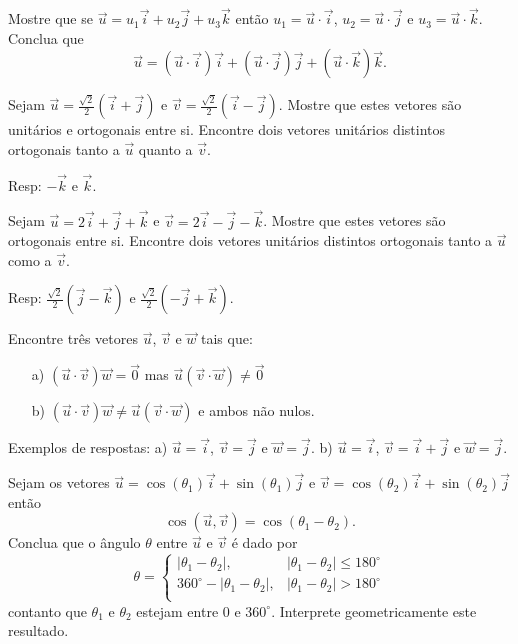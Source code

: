 \begin{exer}Mostre que se $\vec{u}=u_1\vec{i}+u_2\vec{j}+u_3\vec{k}$ então $u_1=\vec{u}\cdot\vec{i}$, $u_2=\vec{u}\cdot\vec{j}$ e $u_3=\vec{u}\cdot\vec{k}$. Conclua que
$$\vec{u}=\left(\vec{u}\cdot\vec{i}\right) \vec{i}+\left(\vec{u}\cdot\vec{j}\right) \vec{j}+\left(\vec{u}\cdot\vec{k}\right) \vec{k}.$$

\end{exer}

\begin{exer}\label{exort1}Sejam $\vec{u}=\frac{\sqrt{2}}{2}\left(\vec{i}+\vec{j}\right)$ e $\vec{v}=\frac{\sqrt{2}}{2}\left(\vec{i}-\vec{j}\right)$. Mostre que estes vetores são unitários e ortogonais entre si. Encontre dois vetores unitários distintos ortogonais tanto a $\vec{u}$ quanto a $\vec{v}$.
\end{exer}
Resp: $-\vec{k}$ e $\vec{k}$.

\begin{exer}\label{exort2} Sejam $\vec{u}=2\vec{i}+\vec{j}+\vec{k}$ e $\vec{v}=2\vec{i}-\vec{j}-\vec{k}$. Mostre que estes vetores são ortogonais entre si. Encontre dois vetores unitários distintos ortogonais tanto a  $\vec{u}$ como a $\vec{v}$.
\end{exer}
Resp: $\frac{\sqrt{2}}{2}\left(\vec{j}-\vec{k}\right)$ e $\frac{\sqrt{2}}{2}\left(-\vec{j}+\vec{k}\right)$.

\begin{exer} Encontre três vetores $\vec{u}$, $\vec{v}$ e $\vec{w}$ tais que:
\begin{itemize}
\item [a)] $\left(\vec{u}\cdot\vec{v}\right)\vec{w}=\vec{0}$ mas $\vec{u}\left(\vec{v}\cdot\vec{w}\right)\neq \vec{0}$
\item [b)] $\left(\vec{u}\cdot\vec{v}\right)\vec{w}\neq \vec{u}\left(\vec{v}\cdot\vec{w}\right)$ e ambos não nulos.
\end{itemize}
\end{exer}

Exemplos de respostas: a) $\vec{u}=\vec{i}$, $\vec{v}=\vec{j}$ e $\vec{w}=\vec{j}$. b) $\vec{u}=\vec{i}$, $\vec{v}=\vec{i}+\vec{j}$ e $\vec{w}=\vec{j}$.

\begin{exer} Sejam os vetores $\vec{u}=\cos(\theta_1)\vec{i}+\sin(\theta_1)\vec{j}$ e $\vec{v}=\cos(\theta_2)\vec{i}+\sin(\theta_2)\vec{j}$ então
$$\cos\left(\vec{u},\vec{v}\right)=\cos(\theta_1-\theta_2).$$
Conclua que o ângulo $\theta$ entre $\vec{u}$ e $\vec{v}$ é dado por
$$\theta=\left\{
\begin{array}{ll}
|\theta_1-\theta_2|,& |\theta_1-\theta_2|\leq 180^\circ\\
360^\circ-|\theta_1-\theta_2|,& |\theta_1-\theta_2|> 180^\circ\\
\end{array}
\right.$$
contanto que $\theta_1$ e $\theta_2$ estejam entre $0$ e $360^\circ$.
Interprete geometricamente este resultado.
\end{exer}

